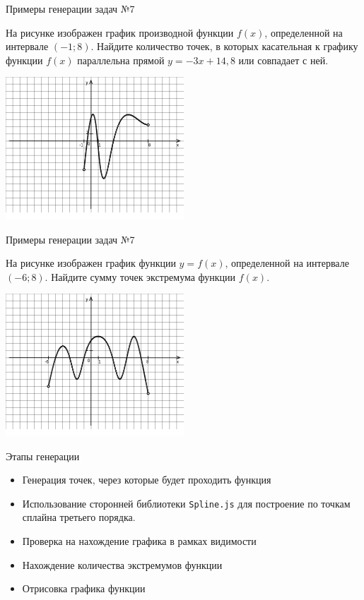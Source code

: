 \documentclass[aspectratio=169]{beamer}
\begin{document}
\begin{frame}{Примеры генерации задач №7}
    
    \begin{multicols}{2}
        На рисунке изображен график производной функции $f(x)$, определенной на интервале $(-1; 8)$. Найдите количество точек, в которых касательная к графику функции $f(x)$ параллельна прямой $y=-3x+ 14{,}8 $ или совпадает с ней.

        \includegraphics[width=0.5\textwidth]{images/776525944899729n0}
      \end{multicols}
        
   
\end{frame}

\begin{frame}{Примеры генерации задач №7}
    \begin{multicols}{2}
        На рисунке изображен график функции $y=f(x)$, определенной на интервале $(-6;8)$. Найдите сумму точек экстремума функции $f(x)$.

        \includegraphics[width=0.5\textwidth]{images/020693809529216n0}
    \end{multicols}
\end{frame}

\begin{frame}{Этапы генерации}
    \begin{itemize}
        \item Генерация точек, через которые будет проходить функция
        \item Использование сторонней библиотеки \texttt{Spline.js} для построение по точкам сплайна третьего порядка.
        \item Проверка на нахождение графика в рамках видимости %
        \item Нахождение количества экстремумов функции
        \item Отрисовка графика функции
    \end{itemize}
    
\end{frame}
\end{document}
